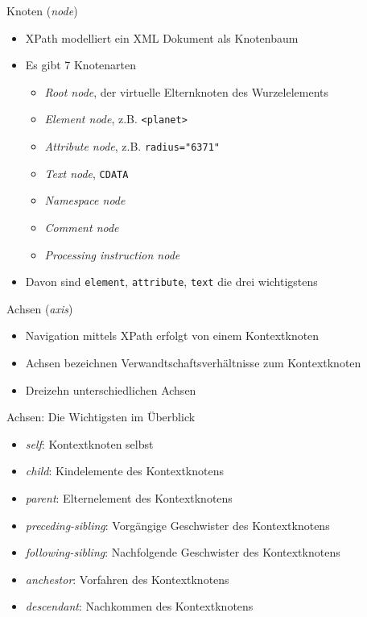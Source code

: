 \documentclass{beamer}
\begin{document}
\begin{frame}{Knoten (\emph{node})}
	
	\begin{itemize}
		\item XPath modelliert ein XML Dokument als Knotenbaum
		\item Es gibt 7 Knotenarten
		\begin{itemize}
			\item \emph{Root node}, der virtuelle Elternknoten des Wurzelelements
			\item \emph{Element node}, z.B. \texttt{<planet>}
			\item \emph{Attribute node}, z.B. \texttt{radius="6371"}
			\item \emph{Text node}, \texttt{CDATA}
			\item \emph{Namespace node}
			\item \emph{Comment node}
			\item \emph{Processing instruction node}
		\end{itemize}
		\item Davon sind \texttt{element}, \texttt{attribute}, \texttt{text} die drei wichtigstens
	\end{itemize}
	
\end{frame}

\begin{frame}{Achsen (\emph{axis})}
	
	\begin{itemize}
		\item Navigation mittels XPath erfolgt von einem Kontextknoten
		\item Achsen bezeichnen Verwandtschaftsverhältnisse zum Kontextknoten
		\item Dreizehn unterschiedlichen Achsen
	\end{itemize}
	
\end{frame}

\begin{frame}{Achsen: Die Wichtigsten im Überblick}
	
	\begin{itemize}
		\item \emph{self}: Kontextknoten selbst
		\item \emph{child}: Kindelemente des Kontextknotens
		\item \emph{parent}: Elternelement des Kontextknotens
		\item \emph{preceding-sibling}: Vorgängige Geschwister des Kontextknotens
		\item \emph{following-sibling}: Nachfolgende Geschwister des Kontextknotens
		\item \emph{anchestor}: Vorfahren des Kontextknotens
		\item \emph{descendant}: Nachkommen des Kontextknotens
	\end{itemize}
	
\end{frame}
\end{document}
